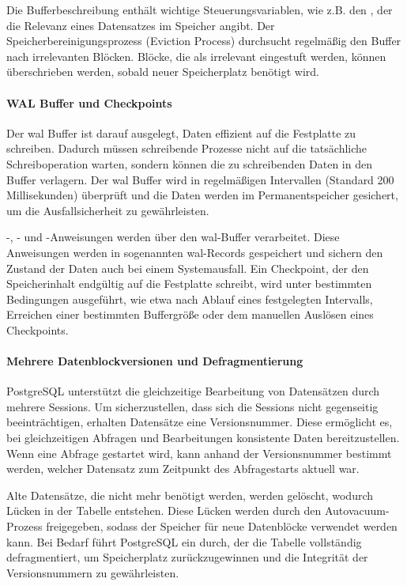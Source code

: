 Die Bufferbeschreibung enthält wichtige Steuerungsvariablen, wie z.B. den , der die Relevanz eines Datensatzes im Speicher angibt. Der Speicherbereinigungsprozess (Eviction Process) durchsucht regelmäßig den Buffer nach irrelevanten Blöcken. Blöcke, die als irrelevant eingestuft werden, können überschrieben werden, sobald neuer Speicherplatz benötigt wird.

\paragraph{WAL Buffer und Checkpoints}
Der \ac{wal} Buffer ist darauf ausgelegt, Daten effizient auf die Festplatte zu schreiben. Dadurch müssen schreibende Prozesse nicht auf die tatsächliche Schreiboperation warten, sondern können die zu schreibenden Daten in den Buffer verlagern. Der \ac{wal} Buffer wird in regelmäßigen Intervallen (Standard 200 Millisekunden) überprüft und die Daten werden im Permanentspeicher gesichert, um die Ausfallsicherheit zu gewährleisten.

-, - und -Anweisungen werden über den \ac{wal}-Buffer verarbeitet. Diese Anweisungen werden in sogenannten \ac{wal}-Records gespeichert und sichern den Zustand der Daten auch bei einem Systemausfall. Ein Checkpoint, der den Speicherinhalt endgültig auf die Festplatte schreibt, wird unter bestimmten Bedingungen ausgeführt, wie etwa nach Ablauf eines festgelegten Intervalls, Erreichen einer bestimmten Buffergröße oder dem manuellen Auslösen eines Checkpoints.

\paragraph{Mehrere Datenblockversionen und Defragmentierung}

PostgreSQL unterstützt die gleichzeitige Bearbeitung von Datensätzen durch mehrere Sessions. Um sicherzustellen, dass sich die Sessions nicht gegenseitig beeinträchtigen, erhalten Datensätze eine Versionsnummer. Diese ermöglicht es, bei gleichzeitigen Abfragen und Bearbeitungen konsistente Daten bereitzustellen. Wenn eine Abfrage gestartet wird, kann anhand der Versionsnummer bestimmt werden, welcher Datensatz zum Zeitpunkt des Abfragestarts aktuell war.

Alte Datensätze, die nicht mehr benötigt werden, werden gelöscht, wodurch Lücken in der Tabelle entstehen. Diese Lücken werden durch den Autovacuum-Prozess freigegeben, sodass der Speicher für neue Datenblöcke verwendet werden kann. Bei Bedarf führt PostgreSQL ein  durch, der die Tabelle vollständig defragmentiert, um Speicherplatz zurückzugewinnen und die Integrität der Versionsnummern zu gewährleisten.

